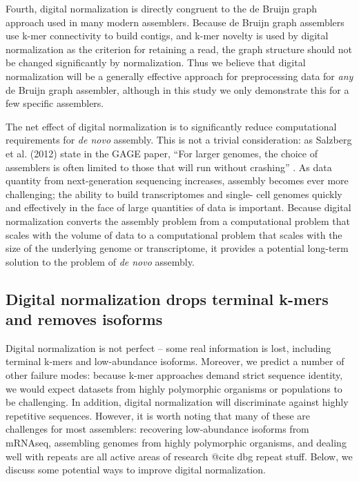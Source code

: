 \documentclass[10pt]{article}
\begin{document}
Fourth, digital normalization is directly congruent to the de Bruijn
graph approach used in many modern assemblers.  Because de Bruijn
graph assemblers use k-mer connectivity to build contigs, and k-mer
novelty is used by digital normalization as the criterion for
retaining a read, the graph structure should not be changed
significantly by normalization.  Thus we believe that digital
normalization will be a generally effective approach for preprocessing
data for {\em any} de Bruijn graph assembler, although in this
study we only demonstrate this for a few specific assemblers.


The net effect of digital normalization is to significantly reduce
computational requirements for {\em de novo} assembly.  This is not a
trivial consideration: as Salzberg et al. (2012) state in the GAGE
paper, ``For larger genomes, the choice of assemblers is often limited
to those that will run without crashing'' \cite{pubmed22147368}.  As
data quantity from next-generation sequencing increases, assembly
becomes ever more challenging; the ability to build transcriptomes and
single- cell genomes quickly and effectively in the face of large
quantities of data is important.  Because digital normalization
converts the assembly problem from a computational problem that scales
with the volume of data to a computational problem that scales with
the size of the underlying genome or transcriptome, it provides a
potential long-term solution to the problem of {\em de novo} assembly.


\subsection*{Digital normalization drops terminal k-mers and removes isoforms}

Digital normalization is not perfect -- some real information is lost,
including terminal k-mers and low-abundance isoforms.  Moreover, we
predict a number of other failure modes: because k-mer approaches
demand strict sequence identity, we would expect datasets from highly
polymorphic organisms or populations to be challenging.  In addition,
digital normalization will discriminate against highly repetitive
sequences.  However, it is worth noting that many of these are
challenges for most assemblers: recovering low-abundance isoforms from
mRNAseq, assembling genomes from highly polymorphic organisms, and
dealing well with repeats are all active areas of research @cite dbg
repeat stuff.  Below, we discuss some potential ways to improve digital
normalization.
\end{document}
